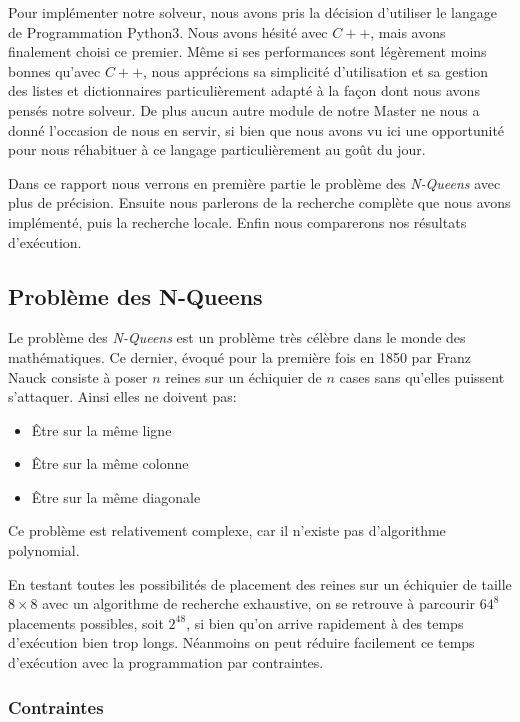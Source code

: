 \documentclass{article}
\begin{document}
Pour implémenter notre solveur, nous avons pris la décision d'utiliser le langage de Programmation Python3. Nous avons hésité avec $C++$, mais avons finalement choisi ce premier. Même si ses performances sont légèrement moins bonnes qu'avec $C++$, nous apprécions sa simplicité d’utilisation et sa gestion des listes et dictionnaires particulièrement adapté à la façon dont nous avons pensés notre solveur. De plus aucun autre module de notre Master ne nous a donné l’occasion de nous en servir, si bien que nous avons vu ici une opportunité pour nous réhabituer à ce langage particulièrement au goût du jour.

Dans ce rapport nous verrons en première partie le problème des \emph{N-Queens} avec plus de précision. Ensuite nous parlerons de la recherche complète que nous avons implémenté, puis la recherche locale. Enfin nous comparerons nos résultats d'exécution. 


\vspace{1cm}

\subsection{Problème des N-Queens}

Le problème des \emph{N-Queens} est un problème très célèbre dans le monde des mathématiques. Ce dernier, évoqué pour la première fois en 1850 par Franz Nauck consiste à poser $n$ reines sur un échiquier de $n$ cases sans qu'elles puissent s'attaquer. Ainsi elles ne doivent pas: 
\begin{itemize}
\item Être sur la même ligne
\item Être sur la même colonne
\item Être sur la même diagonale
\end{itemize}

Ce problème est relativement complexe, car il n'existe pas d'algorithme polynomial.


En testant toutes les possibilités de placement des reines sur un échiquier de taille $8\times8$ avec un algorithme de recherche exhaustive, on se retrouve à parcourir $64^8$ placements possibles, soit $2^{48}$, si bien qu'on arrive rapidement à des temps d'exécution bien trop longs. Néanmoins on peut réduire facilement ce temps d'exécution avec la programmation par contraintes. 


\subsubsection{Contraintes}
\end{document}
